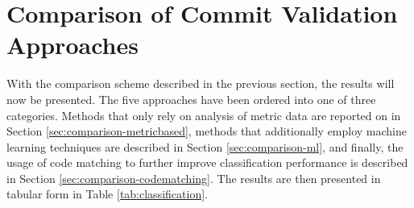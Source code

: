 


\section{Comparison of Commit Validation Approaches}
\label{sec:comparison}

With the comparison scheme described in the previous section,
the results will now be presented. 
The five approaches have been ordered into one of three categories. Methods that only rely on analysis of metric data are reported on in Section \ref{sec:comparison-metricbased}, methods that additionally employ machine learning techniques are described in Section \ref{sec:comparison-ml}, and finally, the usage of code matching to further improve classification performance is described in Section \ref{sec:comparison-codematching}.
The results are then presented in tabular form in Table \ref{tab:classification}.

